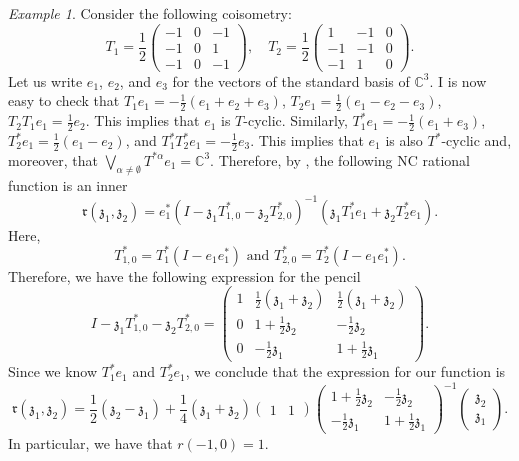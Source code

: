 \documentclass{article}
\theoremstyle{definition}
\theoremstyle{remark}
\newtheorem{example}[thm]{Example}
\numberwithin{equation}{section}
\def\C{\mathbb{C}}
\def\fr{\mathfrak{r}}
\begin{document}
\begin{example}
Consider the following coisometry:
\[
T_1 = \dfrac{1}{2}\begin{pmatrix} -1 & 0 & -1 \\ -1 & 0 & 1 \\ -1 & 0 & -1 \end{pmatrix},\quad T_2 = \dfrac{1}{2} \begin{pmatrix} 1 & -1 & 0 \\ -1 & -1 & 0 \\ -1 & 1 & 0 \end{pmatrix}.
\]
Let us write $e_1$, $e_2$, and $e_3$ for the vectors of the standard basis of $\C^3$. I is now easy to check that $T_1 e_1 = -\frac{1}{2}(e_1 + e_2 + e_3)$, $T_2 e_1 = \frac{1}{2} (e_1 - e_2 - e_3)$, $T_2 T_1 e_1 = \frac{1}{2} e_2$. This implies that $e_1$ is $T$-cyclic. Similarly, $T_1^* e_1 = -\frac{1}{2}(e_1 + e_3)$, $T_2^* e_1 = \frac{1}{2}(e_1 - e_2)$, and $T_1^* T_2^* e_1 = - \frac{1}{2} e_3$. This implies that $e_1$ is also $T^*$-cyclic and, moreover, that $\bigvee_{\alpha \neq \emptyset} T^{* \alpha} e_1 = \C^3$. Therefore, by \cite{JMS-ncratClark}, the following NC rational function is an inner
\[
\fr(\mathfrak{z}_1,\mathfrak{z}_2) = e_1^* \left(I - \mathfrak{z}_1 T_{1,0}^* - \mathfrak{z}_2 T_{2,0}^*\right)^{-1} \left(\mathfrak{z}_1 T_1^* e_1 + \mathfrak{z}_2 T_2^* e_1\right).
\]
Here,
\[
T_{1,0}^* = T_1^*(I - e_1 e_1^*) \text{ and } T_{2,0}^* = T_2^*(I - e_1 e_1^*).
\]
Therefore, we have the following expression for the pencil
\[
I - \mathfrak{z}_1 T_{1,0}^* - \mathfrak{z}_2 T_{2,0}^* = \begin{pmatrix} 1 & \frac{1}{2}(\mathfrak{z}_1 + \mathfrak{z}_2) & \frac{1}{2}(\mathfrak{z}_1 + \mathfrak{z}_2) \\ 0 & 1 + \frac{1}{2} \mathfrak{z}_2 & -\frac{1}{2} \mathfrak{z}_2 \\ 0 & - \frac{1}{2} \mathfrak{z}_1 & 1 + \frac{1}{2} \mathfrak{z}_1 \end{pmatrix}.
\]
Since we know $T_1^* e_1$ and $T_2^* e_1$, we conclude that the expression for our function is
\[
\fr(\mathfrak{z}_1,\mathfrak{z}_2) = \frac{1}{2} (\mathfrak{z}_2 - \mathfrak{z}_1) + \frac{1}{4} (\mathfrak{z}_1 + \mathfrak{z}_2) \begin{pmatrix} 1 & 1 \end{pmatrix} \begin{pmatrix} 1 + \frac{1}{2} \mathfrak{z}_2 & -\frac{1}{2} \mathfrak{z}_2 \\ - \frac{1}{2} \mathfrak{z}_1 & 1 + \frac{1}{2} \mathfrak{z}_1 \end{pmatrix}^{-1} \begin{pmatrix} \mathfrak{z}_2 \\ \mathfrak{z}_1 \end{pmatrix}.
\]
In particular, we have that $r(-1,0) = 1$.


\end{example}
\end{document}
